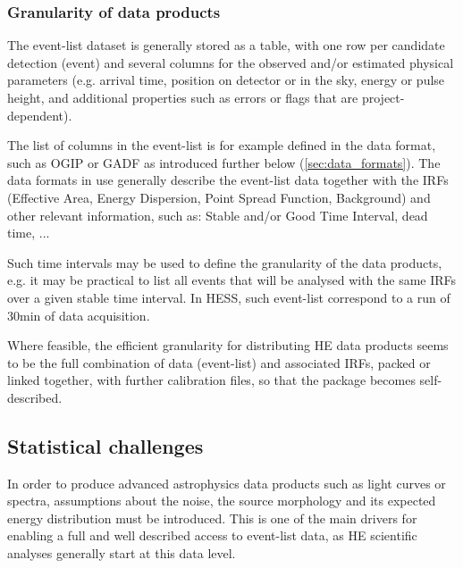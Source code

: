 \documentclass[11pt,a4paper]{ivoa}
\begin{document}
\subsubsection{Granularity of data products}

The event-list dataset is generally stored as a table, with one row per candidate detection (event) and several columns
for the observed and/or estimated physical parameters (e.g. arrival time, position on detector or in the sky, energy or
pulse height, and additional properties such as errors or flags that are project-dependent).

The list of columns in the event-list is for example defined in the data format,
such as OGIP or GADF as introduced further below (\ref{sec:data_formats}). The data formats in use generally describe the event-list data together
with the \gls{IRF}s (Effective Area, Energy Dispersion, Point Spread Function, Background) and other relevant information, such
as: Stable and/or Good Time Interval, dead time, ...

Such time intervals may be used to define the granularity of the data products, e.g. it may be practical to list all events that will be analysed with the same \gls{IRF}s over a given stable time interval. In \gls{HESS}, such event-list correspond to a run of 30min of data acquisition.

Where feasible, the efficient granularity for distributing \gls{HE} data products seems to be the full combination of data (event-list) and associated \gls{IRF}s, packed or linked together, with further calibration files, so that the package becomes self-described.



\subsection{Statistical challenges}

In order to produce advanced astrophysics data products such as light curves or spectra, assumptions
about the noise, the source morphology and its expected energy distribution must be introduced. This is one of the main
drivers for enabling a full and well described access to event-list data, as \gls{HE} scientific analyses generally start at this data level.
\end{document}
